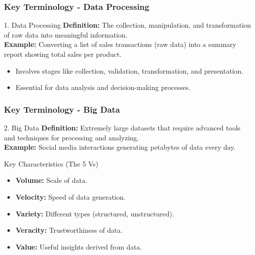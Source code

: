 \documentclass[aspectratio=169]{beamer}
\begin{document}
\begin{frame}[fragile]
    \frametitle{Key Terminology - Data Processing}
    \begin{block}{1. Data Processing}
        \textbf{Definition:} The collection, manipulation, and transformation of raw data into meaningful information. \\
        \textbf{Example:} Converting a list of sales transactions (raw data) into a summary report showing total sales per product.
    \end{block}

    \begin{itemize}
        \item Involves stages like collection, validation, transformation, and presentation.
        \item Essential for data analysis and decision-making processes.
    \end{itemize}
\end{frame}

\begin{frame}[fragile]
    \frametitle{Key Terminology - Big Data}
    \begin{block}{2. Big Data}
        \textbf{Definition:} Extremely large datasets that require advanced tools and techniques for processing and analyzing. \\
        \textbf{Example:} Social media interactions generating petabytes of data every day.
    \end{block}

    \begin{block}{Key Characteristics (The 5 Vs)}
        \begin{itemize}
            \item \textbf{Volume:} Scale of data.
            \item \textbf{Velocity:} Speed of data generation.
            \item \textbf{Variety:} Different types (structured, unstructured).
            \item \textbf{Veracity:} Trustworthiness of data.
            \item \textbf{Value:} Useful insights derived from data.
        \end{itemize}
    \end{block}
\end{frame}
\end{document}
